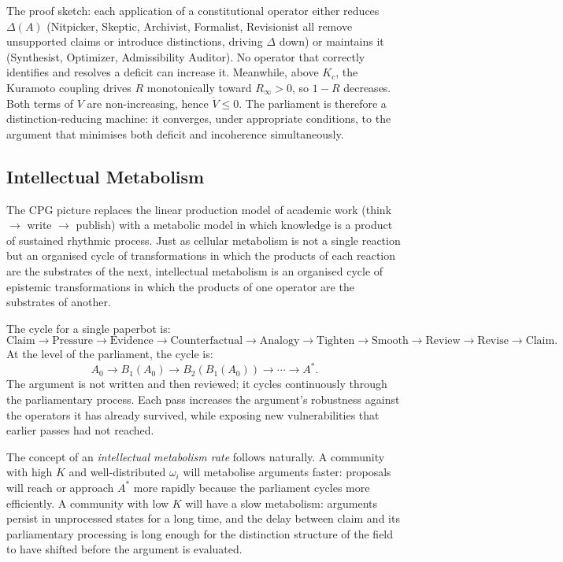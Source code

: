 \documentclass[12pt, letterpaper]{article}
\theoremstyle{remark}
\begin{document}
The proof sketch: each application of a constitutional operator either
reduces $\Delta(A)$ (Nitpicker, Skeptic, Archivist, Formalist, Revisionist
all remove unsupported claims or introduce distinctions, driving $\Delta$
down) or maintains it (Synthesist, Optimizer, Admissibility Auditor).
No operator that correctly identifies and resolves a deficit can increase
it.  Meanwhile, above $K_c$, the Kuramoto coupling drives $R$ monotonically
toward $R_\infty > 0$, so $1 - R$ decreases.  Both terms of $V$ are
non-increasing, hence $\dot{V} \leq 0$.  The parliament is therefore
a distinction-reducing machine: it converges, under appropriate conditions,
to the argument that minimises both deficit and incoherence simultaneously.

\subsection{Intellectual Metabolism}

The CPG picture replaces the linear production model of academic work
(think $\to$ write $\to$ publish) with a metabolic model in which knowledge
is a product of sustained rhythmic process.  Just as cellular metabolism
is not a single reaction but an organised cycle of transformations in which
the products of each reaction are the substrates of the next, intellectual
metabolism is an organised cycle of epistemic transformations in which the
products of one operator are the substrates of another.

The cycle for a single paperbot is:
\begin{equation}
  \text{Claim} \to \text{Pressure} \to \text{Evidence} \to \text{Counterfactual}
  \to \text{Analogy} \to \text{Tighten} \to \text{Smooth} \to \text{Review} \to
  \text{Revise} \to \text{Claim}.
\end{equation}
At the level of the parliament, the cycle is:
\begin{equation}
  A_0 \to B_1(A_0) \to B_2(B_1(A_0)) \to \cdots \to A^*.
\end{equation}
The argument is not written and then reviewed; it cycles continuously through
the parliamentary process.  Each pass increases the argument's robustness
against the operators it has already survived, while exposing new
vulnerabilities that earlier passes had not reached.

The concept of an \emph{intellectual metabolism rate} follows naturally.  A
community with high $K$ and well-distributed $\omega_i$ will metabolise
arguments faster: proposals will reach or approach $A^*$ more rapidly because
the parliament cycles more efficiently.  A community with low $K$ will have
a slow metabolism: arguments persist in unprocessed states for a long time,
and the delay between claim and its parliamentary processing is long enough
for the distinction structure of the field to have shifted before the argument
is evaluated.
\end{document}
